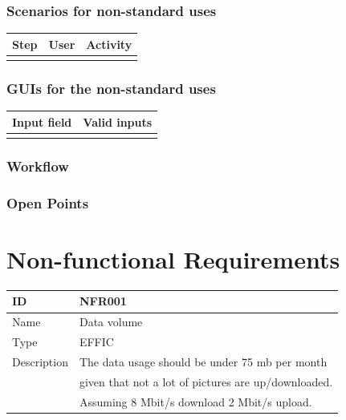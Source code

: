 \documentclass[12pt]{article}
\theoremstyle{definition}
\begin{document}
\subsubsection{Scenarios for non-standard uses}

\begin{tabular}{|l|l|l|}
\hline
Step & User & Activity \\ \hline
 & & \\ \hline
\end{tabular}

\subsubsection{GUIs for the non-standard uses}

\begin{tabular}{|l|l|}
\hline
Input field & Valid inputs \\ \hline
 &  \\ \hline
\end{tabular}

\subsubsection{Workflow}

\subsubsection{Open Points}

\pagebreak

\section{Non-functional Requirements}

\begin{flushleft}
  \begin{tabular}{|l|l|}
  \hline
  ID & NFR001\\ \hline
  Name & Data volume \\ \hline
  Type &  EFFIC\\ \hline
  Description & The data usage should be under 75 mb per month \\
  & given that not a lot of pictures are up/downloaded. \\
  & Assuming 8 Mbit/s download 2 Mbit/s upload. \\ \hline
  \end{tabular}
\end{flushleft}
\end{document}
